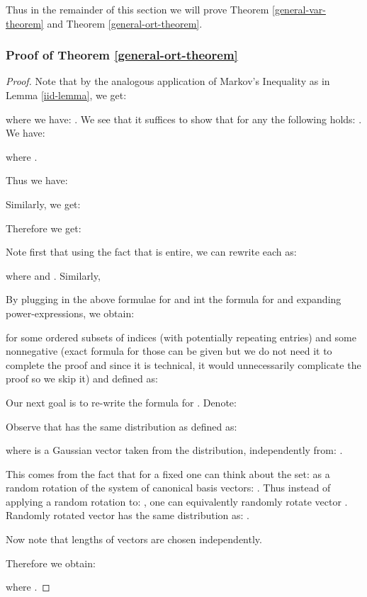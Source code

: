 Thus in the remainder of this section we will prove Theorem \ref{general-var-theorem} and Theorem \ref{general-ort-theorem}.

\subsubsection{Proof of Theorem \ref{general-ort-theorem}}

\begin{proof}
Note that by the analogous application of Markov's Inequality as in Lemma \ref{iid-lemma}, we get:

where we have:
.
We see that it suffices to show that for any  the following holds: 
.
We have: 

where .


Thus we have:


Similarly, we get:


Therefore we get:




Note first that using the fact that  is entire, we can rewrite each  as:


where 
and .
Similarly,


By plugging in the above formulae for  and  int the formula for  and expanding power-expressions, we obtain:

for some ordered subsets of indices (with potentially repeating entries)  and some nonnegative  (exact formula for those can be given but we do not need it to complete the proof and since it is technical, it would unnecessarily complicate the proof so we skip it)
and  defined as:


Our next goal is to re-write the formula for . Denote:


Observe that  has the same distribution as  defined as:



where  is a Gaussian vector taken from the  distribution, independently from: . 

This comes from the fact that for a fixed  one can think about the set:
 as a random rotation of the system of  canonical basis vectors: .
Thus instead of applying a random rotation to: , one can equivalently randomly rotate vector . Randomly rotated vector  has the same distribution as: . 



Now note that lengths of vectors  are chosen independently.

Therefore we obtain:

where .


\end{proof}
